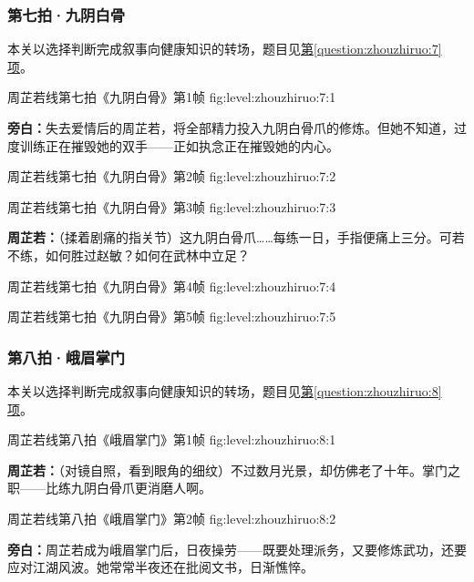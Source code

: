 \clearpage

\subsubsection{第七拍·九阴白骨}\label{plot:zhouzhiruo:7}
本关以选择判断完成叙事向健康知识的转场，题目见\hyperref[question:zhouzhiruo:7]{第\ref*{question:zhouzhiruo:7}项}。

  {周芷若线第七拍《九阴白骨》第1帧}
  {fig:level:zhouzhiruo:7:1}
  {\scriptsize}
  {\textbf{旁白：}失去爱情后的周芷若，将全部精力投入九阴白骨爪的修炼。但她不知道，过度训练正在摧毁她的双手——正如执念正在摧毁她的内心。\par}

  {周芷若线第七拍《九阴白骨》第2帧}
  {fig:level:zhouzhiruo:7:2}
  {\scriptsize}
  {\mbox{}}

  {周芷若线第七拍《九阴白骨》第3帧}
  {fig:level:zhouzhiruo:7:3}
  {\scriptsize}
  {\textbf{周芷若：}（揉着剧痛的指关节）这九阴白骨爪……每练一日，手指便痛上三分。可若不练，如何胜过赵敏？如何在武林中立足？\par}

\clearpage

  {周芷若线第七拍《九阴白骨》第4帧}
  {fig:level:zhouzhiruo:7:4}
  {\scriptsize}
  {\mbox{}}

  {周芷若线第七拍《九阴白骨》第5帧}
  {fig:level:zhouzhiruo:7:5}
  {\scriptsize}
  {\mbox{}}

\subsubsection{第八拍·峨眉掌门}\label{plot:zhouzhiruo:8}
本关以选择判断完成叙事向健康知识的转场，题目见\hyperref[question:zhouzhiruo:8]{第\ref*{question:zhouzhiruo:8}项}。

  {周芷若线第八拍《峨眉掌门》第1帧}
  {fig:level:zhouzhiruo:8:1}
  {\scriptsize}
  {\textbf{周芷若：}（对镜自照，看到眼角的细纹）不过数月光景，却仿佛老了十年。掌门之职——比练九阴白骨爪更消磨人啊。\par}

\clearpage

  {周芷若线第八拍《峨眉掌门》第2帧}
  {fig:level:zhouzhiruo:8:2}
  {\scriptsize}
  {\textbf{旁白：}周芷若成为峨眉掌门后，日夜操劳——既要处理派务，又要修炼武功，还要应对江湖风波。她常常半夜还在批阅文书，日渐憔悴。\par}

